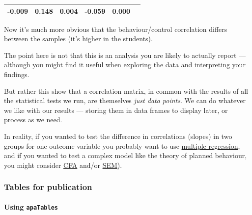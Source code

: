 \documentclass[]{article}
\let\oldparagraph\paragraph
\renewcommand{\paragraph}[1]{\oldparagraph{#1}\mbox{}}
\theoremstyle{definition}
\theoremstyle{definition}
\theoremstyle{definition}
\theoremstyle{remark}
\begin{document}
\begin{longtable}[]{@{}cccccc@{}}
\begin{minipage}[t]{0.13\columnwidth}
-0.009\strut
\end{minipage} & \begin{minipage}[t]{0.13\columnwidth}\centering\strut
0.148\strut
\end{minipage} & \begin{minipage}[t]{0.11\columnwidth}\centering\strut
0.004\strut
\end{minipage} & \begin{minipage}[t]{0.15\columnwidth}\centering\strut
-0.059\strut
\end{minipage} & \begin{minipage}[t]{0.11\columnwidth}\centering\strut
0.000\strut
\end{minipage}\tabularnewline
\bottomrule
\end{longtable}

Now it's much more obvious that the behaviour/control correlation
differs between the samples (it's higher in the students).

The point here is not that this is an analysis you are likely to
actually report --- although you might find it useful when exploring the
data and interpreting your findings.

But rather this show that a correlation matrix, in common with the
results of all the statistical tests we run, are themselves \emph{just
data points}. We can do whatever we like with our results --- storing
them in data frames to display later, or process as we need.

In reality, if you wanted to test the difference in correlations
(slopes) in two groups for one outcome variable you probably want to use
\protect\hyperlink{regression}{multiple regression}, and if you wanted
to test a complex model like the theory of planned behaviour, you might
consider \protect\hyperlink{cfa}{CFA} and/or
\protect\hyperlink{sem}{SEM}).

\subsubsection*{Tables for
publication}\label{correlation-tables-for-publication}

\paragraph{\texorpdfstring{Using
\texttt{apaTables}}{Using apaTables}}\label{using-apatables}
\end{document}
